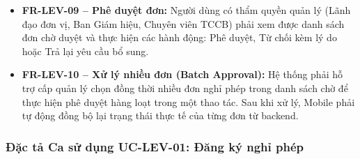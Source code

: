 \begin{itemize}[leftmargin=1.5cm]
    \item \textbf{FR-LEV-09 -- Phê duyệt đơn:} Người dùng có thẩm quyền quản lý (Lãnh đạo đơn vị, Ban Giám hiệu, Chuyên viên TCCB) phải xem được danh sách đơn chờ duyệt và thực hiện các hành động: Phê duyệt, Từ chối kèm lý do hoặc Trả lại yêu cầu bổ sung.
    
    \item \textbf{FR-LEV-10 -- Xử lý nhiều đơn (Batch Approval):} Hệ thống phải hỗ trợ cấp quản lý chọn đồng thời nhiều đơn nghỉ phép trong danh sách chờ để thực hiện phê duyệt hàng loạt trong một thao tác. Sau khi xử lý, Mobile phải tự động đồng bộ lại trạng thái thực tế của từng đơn từ backend.
\end{itemize}

\subsubsection{Đặc tả Ca sử dụng UC-LEV-01: Đăng ký nghỉ phép}


